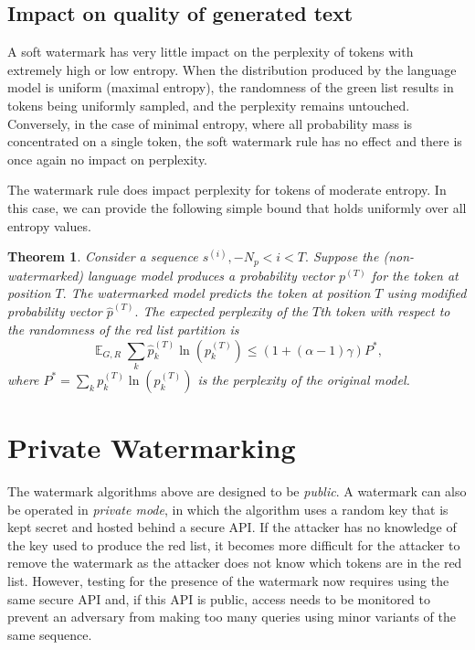 \documentclass{article}
\theoremstyle{plain}
\newtheorem{theorem}{Theorem}[section]
\theoremstyle{definition}
\theoremstyle{remark}
\DeclareMathOperator*{\expect}{\mathbb{E}}
\begin{document}
\subsection{Impact on quality of generated text} 
A soft watermark has very little impact on the perplexity of tokens with extremely high or low entropy. When the distribution produced by the language model is uniform (maximal entropy), the randomness of the green list results in tokens being uniformly sampled, and the perplexity remains untouched.  Conversely, in the case of minimal entropy, where all probability mass is concentrated on a single token, the soft watermark rule has no effect and there is once again no impact on perplexity.

The watermark rule does impact perplexity for tokens of moderate entropy.  In this case, we can provide the following simple bound that holds uniformly over all entropy values. 

\begin{theorem} \label{perpbound}
Consider a sequence $s^{(i)}, -N_p<i<T.$ Suppose the (non-watermarked) language model produces a probability vector $p^{(T)}$ for the token at position $T.$  The watermarked model predicts the token at position $T$ using modified probability vector $\hat p^{(T)}.$  The expected perplexity of the $T$th token with respect to the randomness of the red list partition is 
 $$\expect_{G, R} \sum_k \hat p^{(T)}_k \ln(p^{(T)}_k) \le (1+(\alpha-1)\gamma)P^*,$$
  where $P^*=\sum_k p^{(T)}_k \ln(p^{(T)}_k)$ is the perplexity of the original model.
\end{theorem}

\section{Private Watermarking} 
\label{cryptosec}
  The watermark algorithms above are designed to be \textit{public}.
A watermark can also be operated in \textit{private mode}, in which the algorithm uses a random key that 
is kept secret and hosted behind a secure API. If the attacker has no knowledge of the key used to produce the red list, it becomes more difficult for the attacker to remove the watermark as the attacker does not know which tokens are in the red list. However, testing for the presence of the watermark now requires using the same secure API and, if this API is public, access needs to be monitored to prevent an adversary from making too many queries using minor variants of the same sequence. 
\end{document}
